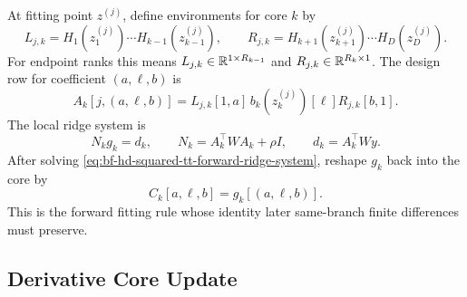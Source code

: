 At fitting point \(z^{(j)}\), define environments for core \(k\) by
\begin{equation}
  L_{j,k}=H_1(z_1^{(j)})\cdots H_{k-1}(z_{k-1}^{(j)}),
  \qquad
  R_{j,k}=H_{k+1}(z_{k+1}^{(j)})\cdots H_D(z_D^{(j)}).
  \label{eq:bf-hd-squared-tt-forward-environments}
\end{equation}
For endpoint ranks this means \(L_{j,k}\in\mathbb{R}^{1\times R_{k-1}}\) and
\(R_{j,k}\in\mathbb{R}^{R_k\times1}\).  The design row for coefficient
\((a,\ell,b)\) is
\begin{equation}
  A_k[j,(a,\ell,b)]
  =
  L_{j,k}[1,a]\,b_k(z_k^{(j)})[\ell]R_{j,k}[b,1].
  \label{eq:bf-hd-squared-tt-forward-design-row}
\end{equation}
The local ridge system is
\begin{equation}
  N_k g_k=d_k,
  \qquad
  N_k=A_k^\top W A_k+\rho I,
  \qquad
  d_k=A_k^\top Wy.
  \label{eq:bf-hd-squared-tt-forward-ridge-system}
\end{equation}
After solving \eqref{eq:bf-hd-squared-tt-forward-ridge-system}, reshape \(g_k\)
back into the core by
\begin{equation}
  C_k[a,\ell,b]=g_k[(a,\ell,b)].
  \label{eq:bf-hd-squared-tt-forward-core-reshape}
\end{equation}
This is the forward fitting rule whose identity later same-branch finite
differences must preserve.

\subsection{Derivative Core Update}
\label{sec:bf-hd-squared-tt-derivative-core-update}

